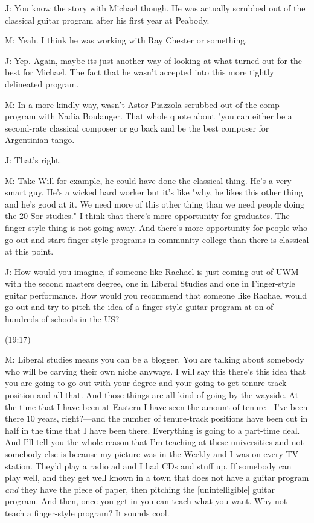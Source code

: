\documentclass[11pt]{article}
\begin{document}
J: You know the story with Michael though. He was actually scrubbed out of the classical guitar program after his first year at Peabody. 

M: Yeah. I think he was working with Ray Chester or something. 

J: Yep. Again, maybe its just another way of looking at what turned out for the best for Michael. The fact that he wasn't accepted into this more tightly delineated program.

M: In a more kindly way, wasn't Astor Piazzola scrubbed out of the comp program with Nadia Boulanger. That whole quote about "you can either be a second-rate classical composer or go back and be the best composer for Argentinian tango.

J: That's right. 

M: Take Will for example, he could have done the classical thing. He's a very smart guy. He's a wicked hard worker but it's like "why, he likes this other thing and he's good at it. We need more of this other thing than we need people doing the 20 Sor studies." I think that there's more opportunity for graduates. The finger-style thing is not going away. And there's more opportunity for people who go out and start finger-style programs in community college than there is classical at this point. 

J: How would you imagine, if someone like Rachael is just coming out of UWM with the second masters degree, one in Liberal Studies and one in Finger-style guitar performance. How would you recommend that someone like Rachael would go out and try to pitch the idea of a finger-style guitar program at on of hundreds of schools in the US?

(19:17)

M: Liberal studies means you can be a blogger. You are talking about somebody who will be carving their own niche anyways. I will say this there's this idea that you are going to go out with your degree and your going to get tenure-track position and all that. And those things are all kind of going by the wayside. At the time that I have been at Eastern I have seen the amount of tenure—I've been there 10 years, right?—and the number of tenure-track positions have been cut in half in the time that I have been there. Everything is going to a part-time deal. And I'll tell you the whole reason that I'm teaching at these universities and not somebody else is because my picture was in the Weekly and I was on every TV station. They'd play a radio ad and I had CDs and stuff up. If somebody can play well, and they get well known in a town that does not have a guitar program \emph{and} they have the piece of paper, then pitching the [unintelligible] guitar program. And then, once you get in you can teach what you want. Why not teach a finger-style program? It sounds cool. 
\end{document}
